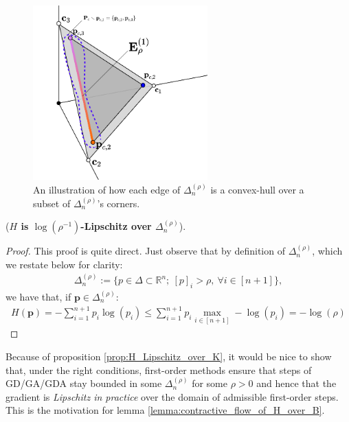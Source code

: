\begin{figure}[h!]
    \centering
    \includegraphics[width=0.6\textwidth]{figures/nvSimplexBorder.png}
    \caption{An illustration of how each edge of $\Delta^{(\rho)}_n$ is a convex-hull over a subset of $\Delta^{(\rho)}_n$'s corners.}
    \label{fig:nvsimplex_border}
\end{figure}

\begin{proposition}
    \label{prop:H_Lipschitz_over_K}
    (\textbf{$H$ is $\log(\rho^{-1})$-Lipschitz over $\Delta^{(\rho)}_n$}). 
    
\end{proposition}

\begin{proof}
    This proof is quite direct. Just observe that by definition of $\Delta^{(\rho)}_n$, which we restate below for clarity:
    \begin{align*}
        \Delta^{(\rho)}_n := \Big\{ p \in \Delta \subset \mathbb{R}^n;~ [p]_i > \rho, ~ \forall i \in [n+1] \Big\},
    \end{align*}
    we have that, if $\bm{p} \in \Delta^{(\rho)}_n$: 
    \begin{align*}
        H(\bm{p}) = - \sum^{n+1}_{i=1}p_i \log(p_i)  \leq   \sum^{n+1}_{i=1}p_i \max_{i \in [n+1]} -\log(p_i) = - \log(\rho) 
    \end{align*}
\end{proof}

Because of proposition \ref{prop:H_Lipschitz_over_K}, it would be nice to show that, under the right conditions, first-order methods ensure that steps of GD/GA/GDA stay bounded in some $\Delta^{(\rho)}_n$ for some $\rho>0$ and hence that the gradient is \textit{Lipschitz in practice} over the domain of admissible first-order steps. This is the motivation for lemma \ref{lemma:contractive_flow_of_H_over_B}.

